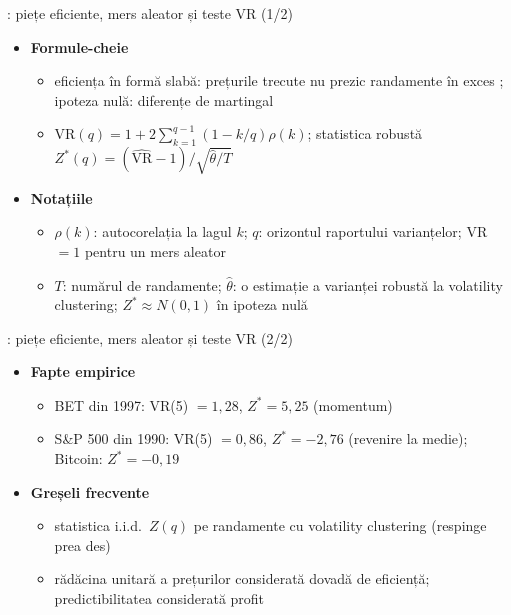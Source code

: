 \begin{frame}{: piețe eficiente, mers aleator și teste VR (1/2)}
\itemsize{\small}
\begin{itemize}
    \item \textbf{Formule-cheie}
    \begin{itemize}
        \item eficiența în formă slabă: prețurile trecute nu prezic randamente în exces ; ipoteza nulă: diferențe de martingal
        \item $\mathrm{VR}(q) = 1 + 2\sum_{k=1}^{q-1}(1 - k/q)\rho(k)$; statistica robustă $Z^*(q) = (\widehat{\mathrm{VR}} - 1)/\sqrt{\hat\theta/T}$ 
    \end{itemize}
    \item \textbf{Notațiile}
    \begin{itemize}
        \item $\rho(k)$: autocorelația la lagul $k$; $q$: orizontul raportului varianțelor; VR $= 1$ pentru un mers aleator
        \item $T$: numărul de randamente; $\hat\theta$: o estimație a varianței robustă la volatility clustering; $Z^* \approx N(0, 1)$ în ipoteza nulă
    \end{itemize}
\end{itemize}
\end{frame}

\begin{frame}{: piețe eficiente, mers aleator și teste VR (2/2)}
\itemsize{\small}
\begin{itemize}
    \item \textbf{Fapte empirice}
    \begin{itemize}
        \item BET din 1997: VR(5) $= 1{,}28$, $Z^* = 5{,}25$ (momentum)
        \item S\&P 500 din 1990: VR(5) $= 0{,}86$, $Z^* = -2{,}76$ (revenire la medie); Bitcoin: $Z^* = -0{,}19$
    \end{itemize}
    \item \textbf{Greșeli frecvente}
    \begin{itemize}
        \item statistica i.i.d.\ $Z(q)$ pe randamente cu volatility clustering (respinge prea des)
        \item rădăcina unitară a prețurilor considerată dovadă de eficiență; predictibilitatea considerată profit
    \end{itemize}
\end{itemize}
\end{frame}


